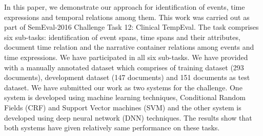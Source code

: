 In this paper, we demonstrate our approach for identification of events, time expressions and temporal relations among them. This work was carried out as part of SemEval-2016 Challenge Task 12: Clinical TempEval. The task comprises six sub-tasks: identification of event spans, time spans and their attributes, document time relation and the narrative container relations among events and time expressions. We have participated in all six sub-tasks. We have provided with a manually annotated dataset which comprises of training dataset (293 documents), development dataset (147 documents) and 151 documents as test dataset. We have submitted our work as two systems for the challenge. One system is developed using machine learning techniques, Conditional Random Fields (CRF) and Support Vector machines (SVM) and the other system is developed using deep neural network (DNN) techniques. The results show that both systems have given relatively same performance on these tasks.
